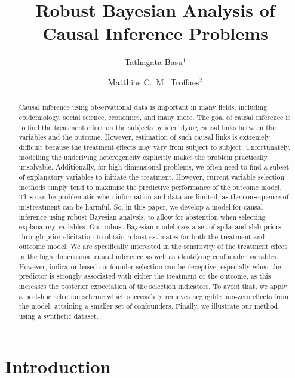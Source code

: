 \documentclass{amsart}
\begin{document}
\title{Robust Bayesian Analysis of Causal Inference Problems}
\author{Tathagata Basu$^1$}
\author{Matthias C.~M.~Troffaes$^2$}
\address{$^1$Civil and Environmental Engineering, University of Strathclyde}
\address{$^2$Department of Mathematical Sciences, Durham University}

\begin{abstract}
Causal inference using observational data is important in
many fields, including epidemiology, social science, economics, and many more.
The goal of causal inference is to find the treatment effect on the subjects
by identifying causal links between the variables and the outcome.
However, estimation of such causal links is extremely 
difficult because the treatment effects may vary from subject 
to subject. Unfortunately, modelling the underlying heterogeneity explicitly makes the 
problem practically unsolvable. Additionally, for high dimensional problems,
we often need to find a subset of 
explanatory variables to initiate the treatment. However, current variable selection methods
simply tend to maximise the predictive performance of the outcome model. This can be problematic when information and data are limited,
as the consequence of mistreatment can be harmful. 
So, in this paper, we develop a model for causal inference using
robust Bayesian analysis, to allow for abstention when selecting
explanatory variables.
Our robust Bayesian model uses a set of spike and slab priors 
through prior elicitation to obtain robust estimates for
both the treatment and outcome model. We are specifically interested 
in the sensitivity of the treatment effect in the high dimensional causal inference
as well as identifying confounder variables. However, indicator
based confounder selection can be deceptive, especially
when the predictor is strongly associated with either the treatment or 
the outcome, as this increases the posterior expectation of the selection
indicators. To avoid that, we apply a post-hoc selection scheme
which successfully removes negligible non-zero effects from the model,
attaining a smaller set of confounders. Finally, we illustrate
our method using a synthetic dataset.
\end{abstract}

\maketitle

\section{Introduction}\label{sec:intro}
\end{document}
